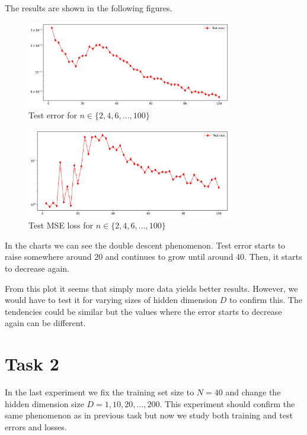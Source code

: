 \documentclass[a4paper,11pt]{article}
\begin{document}
The results are shown in the following figures.

\begin{figure}[ht]
    \centering
    \includegraphics[width=0.8\textwidth]{../training_size/test_error.png}
    \caption{Test error for $n \in \{2, 4, 6, \dots, 100\}$}
\end{figure}

\begin{figure}[ht]
    \centering
    \includegraphics[width=0.8\textwidth]{../training_size/test_loss.png}
    \caption{Test MSE loss for $n \in \{2, 4, 6, \dots, 100\}$}
\end{figure}

In the charts we can see the double descent phenomenon. Test error starts to raise somewhere around 20 and continues to grow until around 40.
Then, it starts to decrease again.

From this plot it seems that simply more data yields better results.
However, we would have to test it for varying sizes of hidden dimension $D$ to confirm this.
The tendencies could be similar but the values where the error starts to decrease again can be different.

\section{Task 2}
In the last experiment we fix the training set size to $N=40$ and change the hidden dimension size $D=1,10,20,\dots,200$.
This experiment should confirm the same phenomenon as in previous task but now we study both training and test errors and losses.
\end{document}

